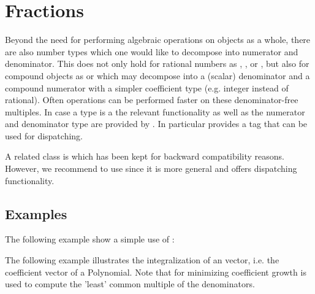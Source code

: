 \section{Fractions}

Beyond the need for performing algebraic operations on objects as a 
whole, there are also number types which one would like to decompose into 
numerator and denominator. This does not only hold for rational numbers 
as , ,  or , but 
also for compound objects as  or  
which may decompose into a (scalar) 
denominator and a compound numerator with a simpler coefficient type 
(e.g. integer instead of rational). Often operations can be performed faster on 
these denominator-free multiples. In case a type is a  
the relevant functionality as well as the numerator and denominator 
type are provided by . In particular  
 provides a tag  that can be
used for dispatching.

A related class is  which has been kept for backward 
compatibility reasons. However, we recommend to use  since
it is more general and offers dispatching functionality. 

\subsection{Examples}

The following example show a simple use of :

The following example illustrates the integralization of an vector, 
i.e. the coefficient vector of a Polynomial. Note that for minimizing 
coefficient growth  is used to 
compute the 'least' common multiple of the denominators.


